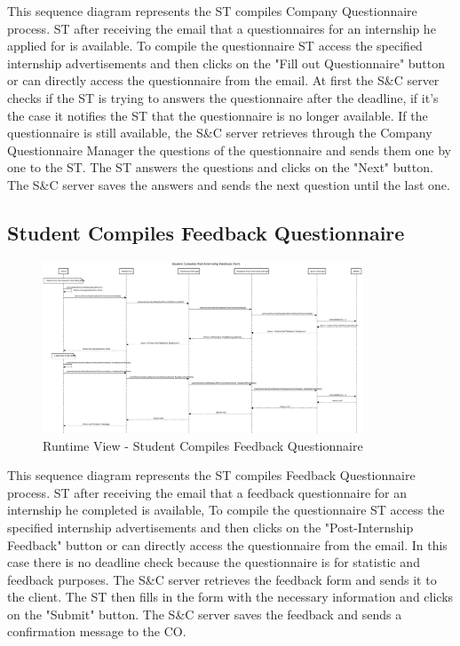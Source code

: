 \par This sequence diagram represents the ST compiles Company Questionnaire process. ST after receiving the email that
a questionnaires for an internship he applied for is available. To compile the questionnaire ST access the specified internship
advertisements and then clicks on the "Fill out Questionnaire" button or can directly access the questionnaire from the email.
At first the S\&C server checks if the ST is trying to answers the questionnaire after the deadline, if it's the case it notifies
the ST that the questionnaire is no longer available. If the questionnaire is still available, the S\&C server retrieves through
the Company Questionnaire Manager the questions of the questionnaire and sends them one by one to the ST.
The ST answers the questions and clicks on the "Next" button. The S\&C server saves the answers and sends the next question
until the last one.


\subsection{Student Compiles Feedback Questionnaire}
\label{sub:student-compiles-feedback-questionnaire}%

\begin{figure}[H]
      \centering
      \includegraphics[width=0.85\textwidth]{Images/RV_04b.pdf}
      \caption{Runtime View - Student Compiles Feedback Questionnaire}
      \label{fig:rv-student-compiles-feedback-questionnaire}
\end{figure}

\par This sequence diagram represents the ST compiles Feedback Questionnaire process. ST after receiving the email that
a feedback questionnaire for an internship he completed is available, To compile the questionnaire ST access the specified internship
advertisements and then clicks on the "Post-Internship Feedback" button or can directly access the questionnaire from the email.
In this case there is no deadline check because the questionnaire is for statistic and feedback purposes. The S\&C server retrieves
the feedback form and sends it to the client. The ST then fills in the form with the necessary information and clicks on the
"Submit" button. The S\&C server saves the feedback and sends a confirmation message to the CO.

